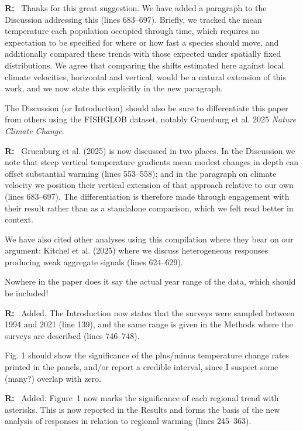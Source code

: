 \documentclass[11pt]{article}
\newcommand{\reviewer}[1]{\par\medskip\noindent\textcolor{revcolor}{#1}\par}
\newenvironment{reply}
{\par\smallskip\begingroup\color{replycolor}\noindent\textbf{R:}\ }
{\endgroup\par\medskip}
\begin{document}
\begin{reply}
Thanks for this great suggestion. We have added a paragraph to the Discussion addressing this (lines 683--697). Briefly, we tracked the mean temperature each population occupied through time, which requires no expectation to be specified for where or how fast a species should move, and additionally compared these trends with those expected under spatially fixed distributions. We agree that comparing the shifts estimated here against local climate velocities, horizontal and vertical, would be a natural extension of this work, and we now state this explicitly in the new paragraph.
\end{reply}

\reviewer{The Discussion (or Introduction) should also be sure to differentiate this paper from others using the FISHGLOB dataset, notably Gruenburg et al. 2025 \textit{Nature Climate Change}.}

\begin{reply}
Gruenburg et al. (2025) is now discussed in two places. In the Discussion we note that steep vertical temperature gradients mean modest changes in depth can offset substantial warming (lines 553--558); and in the paragraph on climate velocity we position their vertical extension of that approach relative to our own (lines 683--697). The differentiation is therefore made through engagement with their result rather than as a standalone comparison, which we felt read better in context.

We have also cited other analyses using this compilation where they bear on our argument: Kitchel et al. (2025) where we discuss heterogeneous responses producing weak aggregate signals (lines 624--629).
\end{reply}

\reviewer{Nowhere in the paper does it say the actual year range of the data, which should be included!}

\begin{reply}
Added. The Introduction now states that the surveys were sampled between 1994 and 2021 (line 139), and the same range is given in the Methods where the surveys are described (lines 746--748).
\end{reply}

\reviewer{Fig. 1 should show the significance of the plus/minus temperature change rates printed in the panels, and/or report a credible interval, since I suspect some (many?) overlap with zero.}

\begin{reply}
Added. Figure~1 now marks the significance of each regional trend with asterisks. This is now reported in the Results and forms the basis of the new analysis of responses in relation to regional warming (lines 245--363).
\end{reply}
\end{document}
